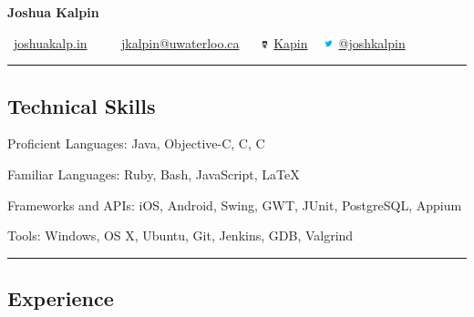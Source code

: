 \documentclass[10pt,letterpaper]{article}
\newenvironment{indentsection}[1]%
{\begin{list}{}%
	{\setlength{\leftmargin}{#1}}%
	\item[]%
}
{\end{list}}
\newcommand{\CPP}
{C\nolinebreak[4]\hspace{-.05em}\raisebox{.22ex}{\footnotesize\bf ++}}
\begin{document}
\begin{center}
{\LARGE \textbf{Joshua Kalpin}}
\vspace{0.1cm}

\Mundus \ \href{http://joshuakalp.in}{joshuakalp.in} \ \textbullet
\ \ \Letter \ \href{mailto:jkalpin@uwaterloo.ca}{jkalpin@uwaterloo.ca} \ \textbullet
\ \includegraphics[height=6pt]{Octocat} 
\href{https://github.com/kapin}{Kapin} \ \textbullet
 \includegraphics[height=10pt]{twitter}
\href{https://twitter.com/joshkalpin}{@joshkalpin}
\end{center}

\hrule
\vspace{-0.4em}
\subsection*{Technical Skills}

\begin{indentsection}{\parindent}
\begin{description*}
	\item[Proficient Languages:]
	Java, Objective-C, C, \CPP
	\item[Familiar Languages:]
	Ruby, Bash, JavaScript, \LaTeX
	\item[Frameworks and APIs:]
	iOS, Android, Swing, GWT, JUnit, PostgreSQL, Appium
	\item[Tools:]
	Windows, OS X, Ubuntu, Git, Jenkins, GDB, Valgrind
\end{description*}
\end{indentsection}

\hrule
\vspace{-0.4em}
\subsection*{Experience}
\end{document}
